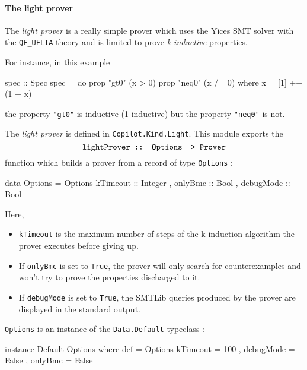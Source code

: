 \paragraph{The light prover}\label{the-light-prover}

The \emph{light prover} is a really simple prover which uses the Yices
SMT solver with the \texttt{QF\_UFLIA} theory and is limited to prove
\emph{k-inductive} properties.

For instance, in this example

\begin{code}
spec :: Spec
spec = do
  prop "gt0"  (x > 0)
  prop "neq0" (x /= 0)
  where
    x = [1] ++ (1 + x)
\end{code}

the property \texttt{"gt0"} is inductive (1-inductive) but the property
\texttt{"neq0"} is not.

The \emph{light prover} is defined in \texttt{Copilot.Kind.Light}. This
module exports the 
$$\texttt{lightProver :: Options -\textgreater{} Prover}$$ function which
builds a prover from a record of type \texttt{Options} :

\begin{code}
data Options = Options 
  { kTimeout  :: Integer
  , onlyBmc   :: Bool
  , debugMode :: Bool } 

\end{code}
Here,

\begin{itemize}
\itemsep1pt\parskip0pt
\item
  \texttt{kTimeout} is the maximum number of steps of the k-induction
  algorithm the prover executes before giving up.
\item
  If \texttt{onlyBmc} is set to \texttt{True}, the prover will only
  search for counterexamples and won't try to prove the properties
  discharged to it.
\item
  If \texttt{debugMode} is set to \texttt{True}, the SMTLib queries
  produced by the prover are displayed in the standard output.
\end{itemize}

\texttt{Options} is an instance of the \texttt{Data.Default} typeclass :

\begin{code}
instance Default Options where
  def = Options 
    { kTimeout  = 100
    , debugMode = False 
    , onlyBmc   = False }

\end{code}

